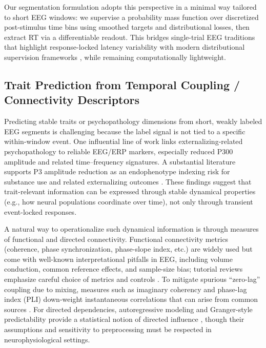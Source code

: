\documentclass[12pt]{article}
\begin{document}
Our segmentation formulation adopts this perspective in a minimal way tailored to short EEG windows: we supervise a
probability mass function over discretized post-stimulus time bins using smoothed targets and distributional losses, then
extract RT via a differentiable readout. This bridges single-trial EEG traditions that highlight response-locked latency
variability \citep{Jung1998SingleTrialERP} with modern distributional supervision frameworks \citep{Geng2016LabelDistributionLearning,Lee2018DeepHit},
while remaining computationally lightweight.

\subsection{Trait Prediction from Temporal Coupling / Connectivity Descriptors}
Predicting stable traits or psychopathology dimensions from short, weakly labeled EEG segments is challenging because the
label signal is not tied to a specific within-window event. One influential line of work links externalizing-related
psychopathology to reliable EEG/ERP markers, especially reduced P300 amplitude and related time--frequency signatures.
A substantial literature supports P3 amplitude reduction as an endophenotype indexing risk for substance use and related
externalizing outcomes \citep{Iacono2003P300Externalizing,IaconoMalone2011P300Endophenotype,Patrick2006P300Externalizing,Hicks2007GenesP3Externalizing}.
These findings suggest that trait-relevant information can be expressed through stable dynamical properties (e.g., how
neural populations coordinate over time), not only through transient event-locked responses.

A natural way to operationalize such dynamical information is through measures of functional and directed connectivity.
Functional connectivity metrics (coherence, phase synchronization, phase-slope index, etc.) are widely used but come with
well-known interpretational pitfalls in EEG, including volume conduction, common reference effects, and sample-size bias;
tutorial reviews emphasize careful choice of metrics and controls \citep{BastosSchoffelen2015ConnectivityTutorial}. To
mitigate spurious ``zero-lag'' coupling due to mixing, measures such as imaginary coherency and phase-lag index (PLI)
down-weight instantaneous correlations that can arise from common sources \citep{Nolte2004ImaginaryCoherency,Stam2007PLI}.
For directed dependencies, autoregressive modeling and Granger-style predictability provide a statistical notion of
directed influence \citep{Granger1969,BarnettSeth2014MVGC,Seth2015GrangerNeuro}, though their assumptions and sensitivity
to preprocessing must be respected in neurophysiological settings.
\end{document}
